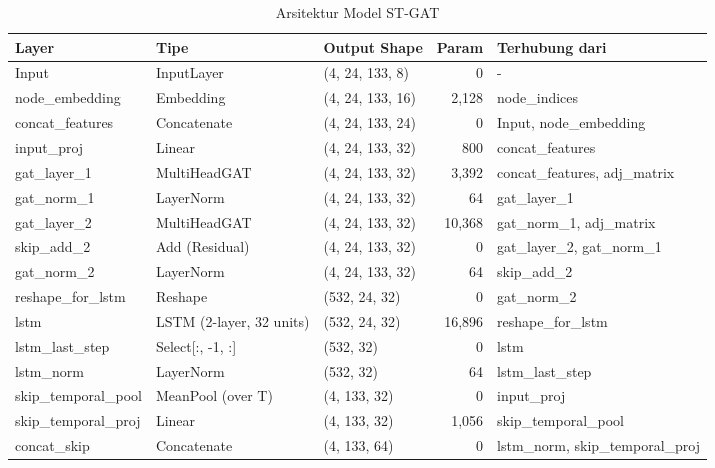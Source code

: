 \begin{table}[h]
    \centering
    \caption{Arsitektur Model ST-GAT}
    \label{tab:model_architecture}
    \scriptsize
    \begin{tabular}{|l|l|l|r|l|}
        \hline
        \textbf{Layer} & \textbf{Tipe} & \textbf{Output Shape} & \textbf{Param} & \textbf{Terhubung dari} \\
        \hline
        \hline
        Input & InputLayer & (4, 24, 133, 8) & 0 & - \\
        \hline
        node\_embedding & Embedding & (4, 24, 133, 16) & 2,128 & node\_indices \\
        \hline
        concat\_features & Concatenate & (4, 24, 133, 24) & 0 & Input, node\_embedding \\
        \hline
        input\_proj & Linear & (4, 24, 133, 32) & 800 & concat\_features \\
        \hline
        gat\_layer\_1 & MultiHeadGAT & (4, 24, 133, 32) & 3,392 & concat\_features, adj\_matrix \\
        \hline
        gat\_norm\_1 & LayerNorm & (4, 24, 133, 32) & 64 & gat\_layer\_1 \\
        \hline
        gat\_layer\_2 & MultiHeadGAT & (4, 24, 133, 32) & 10,368 & gat\_norm\_1, adj\_matrix \\
        \hline
        skip\_add\_2 & Add (Residual) & (4, 24, 133, 32) & 0 & gat\_layer\_2, gat\_norm\_1 \\
        \hline
        gat\_norm\_2 & LayerNorm & (4, 24, 133, 32) & 64 & skip\_add\_2 \\
        \hline
        reshape\_for\_lstm & Reshape & (532, 24, 32) & 0 & gat\_norm\_2 \\
        \hline
        lstm & LSTM (2-layer, 32 units) & (532, 24, 32) & 16,896 & reshape\_for\_lstm \\
        \hline
        lstm\_last\_step & Select[:, -1, :] & (532, 32) & 0 & lstm \\
        \hline
        lstm\_norm & LayerNorm & (532, 32) & 64 & lstm\_last\_step \\
        \hline
        skip\_temporal\_pool & MeanPool (over T) & (4, 133, 32) & 0 & input\_proj \\
        \hline
        skip\_temporal\_proj & Linear & (4, 133, 32) & 1,056 & skip\_temporal\_pool \\
        \hline
        concat\_skip & Concatenate & (4, 133, 64) & 0 & lstm\_norm, skip\_temporal\_proj \\

\end{tabular}
\end{table}

